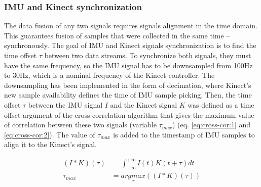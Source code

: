 \documentclass[sensors,article,submit,moreauthors,pdftex,10pt,a4paper]{mdpi}
\begin{document}
	\subsubsection{IMU and Kinect synchronization}
	The data fusion of any two signals requires signals alignment in the time domain. This guarantees fusion of samples that were collected in the same time -- synchronously. The goal of IMU and Kinect signals synchronization is to find the time offset $\tau$ between two data streams. To synchronize both signals, they must have the same frequency, so the IMU signal has to be downsampled from 100Hz to 30Hz, which is a nominal frequency of the Kinect controller. The downsampling has been implemented in the form of decimation, where Kinect’s new sample availability defines the time of IMU sample picking. Then, the time offset $\tau$ between the IMU signal $I$ and the Kinect signal $K$ was defined as a time offset argument of the cross-correlation algorithm that gives the maximum value of correlation between these two signals (variable $\tau_{max}$) (eq. \ref{eq:cross-cor:1} and \ref{eq:cross-cor:2}). The value of $\tau_{max}$ is added to the timestamp of IMU samples to align it to the Kinect’s signal.
		
	\begin{subequations}
		\begin{align}
			(I \ast K)(\tau) & = \int_{-\infty}^{+\infty}I(t)K(t+\tau)dt\label{eq:cross-cor:1}   \\
			\tau_{max}       & = \underset{\tau}{argmax}((I \ast K)(\tau))\label{eq:cross-cor:2} 
		\end{align}
		\label{eq:cross-cor}
	\end{subequations}
		
		
		
\end{document}
